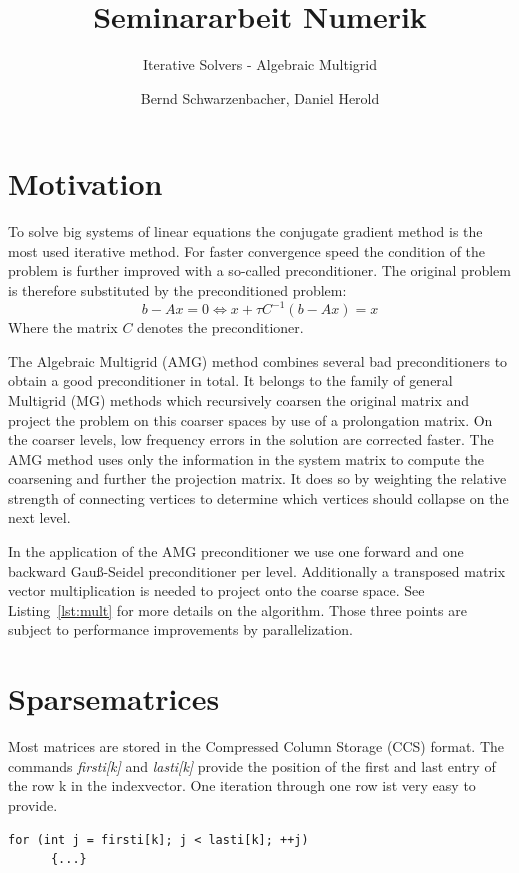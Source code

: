 \documentclass[a4paper,11pt]{scrartcl}
\title{Seminararbeit Numerik}
\subtitle{Iterative Solvers - Algebraic Multigrid}
\author{Bernd Schwarzenbacher, Daniel Herold}
\begin{document}
\maketitle
\tableofcontents
\pagebreak

\section{Motivation}
To solve big systems of linear equations the conjugate gradient method is the
most used iterative method. For faster convergence speed the condition of the
problem is further improved with a so-called preconditioner.
The original problem is therefore substituted by the preconditioned problem:
$$b-Ax = 0 \iff x + \tau C^{-1} (b-Ax) = x$$
Where the matrix $C$ denotes the preconditioner.

The Algebraic Multigrid (AMG) method combines several bad preconditioners to
obtain a good preconditioner in total. It belongs to the family of general
Multigrid (MG) methods which recursively coarsen the original matrix and
project the problem on this coarser spaces by use of a prolongation matrix.
On the coarser levels, low frequency errors in the solution are corrected
faster. The AMG method uses only the information in the system matrix to
compute the coarsening and further the projection matrix. It does so by
weighting the relative strength of connecting vertices to determine which
vertices should collapse on the next level.
\cite{numerik} \cite{numpde}

In the application of the AMG preconditioner we use one forward and one
backward Gauß-Seidel preconditioner per level. Additionally a
transposed matrix vector multiplication is needed to project onto the
coarse space. See Listing~\ref{lst:mult} for more details on the algorithm.
Those three points are subject to performance improvements by parallelization.

\section{Sparsematrices}
Most matrices are stored in the Compressed Column Storage (CCS) format.
The commands {\em firsti[k]} and {\em lasti[k]} provide the position of the
first and last entry of the row k in the indexvector. One
iteration through one row ist very easy to provide.

\begin{lstlisting}
for (int j = firsti[k]; j < lasti[k]; ++j)
      {...}

\end{lstlisting}
\end{document}
